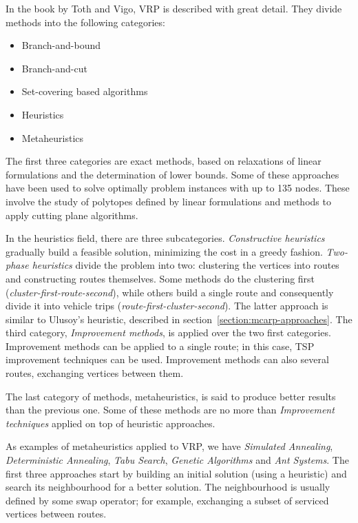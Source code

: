 In the book by Toth and Vigo\citep{Toth01book}, VRP is described with great detail.
They divide methods into the following categories:

\begin{itemize}
	\item Branch-and-bound
	\item Branch-and-cut
	\item Set-covering based algorithms
	\item Heuristics
	\item Metaheuristics
\end{itemize}

The first three categories are exact methods, based on relaxations of linear
formulations and the determination of lower bounds. Some of these approaches
have been used to solve optimally problem instances with up to 135
nodes\citep{Naddef01}. These involve the study of polytopes defined by linear
formulations and methods to apply cutting plane algorithms.

In the heuristics field, there are three subcategories\citep{Laporte01}.
\textit{Constructive heuristics} gradually build a feasible solution,
minimizing the cost in a greedy fashion. \textit{Two-phase heuristics} divide
the problem into two: clustering the vertices into routes and constructing
routes themselves. Some methods do the clustering first
(\textit{cluster-first-route-second}), while others build a single route and
consequently divide it into vehicle trips
(\textit{route-first-cluster-second})\citep{Tucker76}. The latter approach is
similar to Ulusoy's heuristic, described in
section~\ref{section:mcarp-approaches}. The third category, \textit{Improvement
methods}, is applied over the two first categories. Improvement methods can be
applied to a single route; in this case, TSP improvement techniques can be
used. Improvement methods can also several routes, exchanging vertices between
them.

The last category of methods, metaheuristics, is said to produce better results
than the previous one\citep{Gendreau01}. Some of these methods are no more than
\textit{Improvement techniques} applied on top of heuristic approaches.

As examples of metaheuristics applied to VRP, we have \textit{Simulated
Annealing}, \textit{Deterministic Annealing}, \textit{Tabu Search},
\textit{Genetic Algorithms} and \textit{Ant Systems}.  The first three
approaches start by building an initial solution (using a heuristic) and search
its neighbourhood for a better solution. The neighbourhood is usually defined
by some swap operator; for example, exchanging a subset of serviced vertices
between routes.


